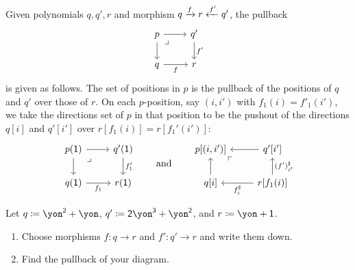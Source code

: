 \documentclass[Book-Poly]{subfiles}
\begin{document}
\begin{example}\label{ex.pullbacks_in_poly}
Given polynomials $q,q',r$ and morphism $q\xrightarrow{f} r\xleftarrow{f'} q'$, the pullback 
\[
\begin{tikzcd}
	p\ar[r]\ar[d]&
	q'\ar[d, "f'"]\\
	q\ar[r, "f"']&
	r\ar[ul, phantom, very near end, "\lrcorner"]
\end{tikzcd}
\]
 is given as follows. The set of positions in $p$ is the pullback of the positions of $q$ and $q'$ over those of $r$. On each $p$-position, say $(i, i')$ with $f_1(i)=f'_1(i')$, we take the directions set of $p$ in that position to be the  pushout of the directions $q[i]$ and $q'[i']$ over $r[f_1(i)]=r[f_1'(i')]$:
\begin{equation}\label{eqn.pullback_poly}
\begin{tikzcd}
	p(\1)\ar[r]\ar[d]&
	q'(\1)\ar[d, "f_1'"]\\
	q(\1)\ar[r, "f_1"']&
	r(\1)\ar[ul, phantom, very near end, "\lrcorner"]
\end{tikzcd}
\qqand
\begin{tikzcd}
	p[(i,i')]\ar[from=r]\ar[from=d]&
	q'[i']\ar[from=d, "(f')_{i'}^\sharp"']\\
	q[i]\ar[from=r, "f^\sharp_i"]&
	r[f_1(i)]\ar[ul, phantom, very near end, "\ulcorner"]
\end{tikzcd}
\end{equation}
\end{example}

\begin{exercise}
Let $q\coloneqq \yon^\2+\yon$, $q'\coloneqq\2\yon^\3+\yon^\2$, and $r\coloneq\yon+\1$.
\begin{enumerate}
	\item Choose morphisms $f\colon q\to r$ and $f'\colon q'\to r$ and write them down.
	\item Find the pullback of your diagram.
\qedhere
\end{enumerate}
\end{exercise}
\end{document}
